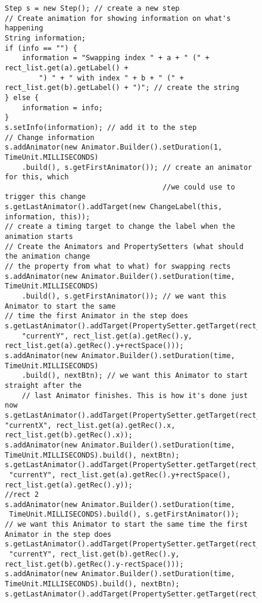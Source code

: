 \begin{figure}
\begin{center}
\begin{verbatim}
Step s = new Step(); // create a new step
// Create animation for showing information on what's happening
String information;
if (info == "") {
    information = "Swapping index " + a + " (" + rect_list.get(a).getLabel() + 
        ") " + " with index " + b + " (" + rect_list.get(b).getLabel() + ")"; // create the string
} else {
    information = info;
}
s.setInfo(information); // add it to the step
// Change information
s.addAnimator(new Animator.Builder().setDuration(1, TimeUnit.MILLISECONDS)
    .build(), s.getFirstAnimator()); // create an animator for this, which 
                                     //we could use to trigger this change
s.getLastAnimator().addTarget(new ChangeLabel(this, information, this));
// create a timing target to change the label when the animation starts	
// Create the Animators and PropertySetters (what should the animation change 
// the property from what to what) for swapping rects
s.addAnimator(new Animator.Builder().setDuration(time, TimeUnit.MILLISECONDS)
	.build(), s.getFirstAnimator()); // we want this Animator to start the same
// time the first Animator in the step does
s.getLastAnimator().addTarget(PropertySetter.getTarget(rect_list.get(a), 
	"currentY", rect_list.get(a).getRec().y, rect_list.get(a).getRec().y+rectSpace()));
s.addAnimator(new Animator.Builder().setDuration(time, TimeUnit.MILLISECONDS)
	.build(), nextBtn); // we want this Animator to start straight after the 
	// last Animator finishes. This is how it's done just now
s.getLastAnimator().addTarget(PropertySetter.getTarget(rect_list.get(a), 
"currentX", rect_list.get(a).getRec().x, rect_list.get(b).getRec().x)); 
s.addAnimator(new Animator.Builder().setDuration(time, TimeUnit.MILLISECONDS).build(), nextBtn);
s.getLastAnimator().addTarget(PropertySetter.getTarget(rect_list.get(a),
 "currentY", rect_list.get(a).getRec().y+rectSpace(), rect_list.get(a).getRec().y));		
//rect 2
s.addAnimator(new Animator.Builder().setDuration(time,
 TimeUnit.MILLISECONDS).build(), s.getFirstAnimator());															// we want this Animator to start the same time the first Animator in the step does
s.getLastAnimator().addTarget(PropertySetter.getTarget(rect_list.get(b),
 "currentY", rect_list.get(b).getRec().y, rect_list.get(b).getRec().y-rectSpace()));
s.addAnimator(new Animator.Builder().setDuration(time, TimeUnit.MILLISECONDS).build(), nextBtn);
s.getLastAnimator().addTarget(PropertySetter.getTarget(rect_list.get(b),

\end{verbatim}
\end{center}
\end{figure}
